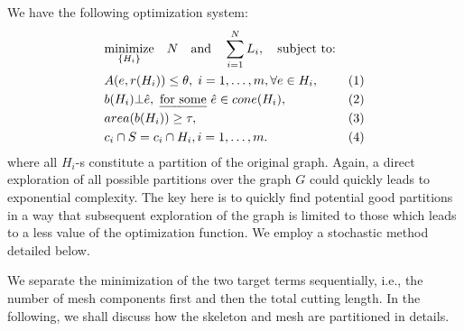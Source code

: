 We have the following optimization system:
\begin{equation*}
\begin{aligned}
& \underset{\{H_i\}}{\text{minimize}} \quad N \quad \text{and} \quad \sum_{i=1}^N{L_i},
\quad \text{subject to:} \\
& A(e, r(H_i)) \leq \theta, \; i = 1, \ldots, m, \forall e \in H_i, & (1)\\
& b(H_i) \bot \hat{e}, \text{ \emph{for some} } \hat{e} \in cone(H_i), & (2)\\
& area(b(H_i)) \geq \tau, & (3)\\
& c_i \cap S = c_i \cap H_i, i = 1, \ldots, m.  & (4)
\end{aligned}
\end{equation*}
where all $H_i$-s constitute a partition of the original graph. Again, a direct exploration of all possible partitions over the graph $G$ could quickly leads to exponential complexity. The key here is to quickly find potential good partitions in a way that subsequent exploration of the graph is limited to those which leads to a less value of the optimization function. We employ a stochastic method detailed below.

We separate the minimization of the two target terms sequentially, i.e., the number of mesh components first and then the total cutting length. %
In the following, we shall discuss how the skeleton and mesh are partitioned in details.

